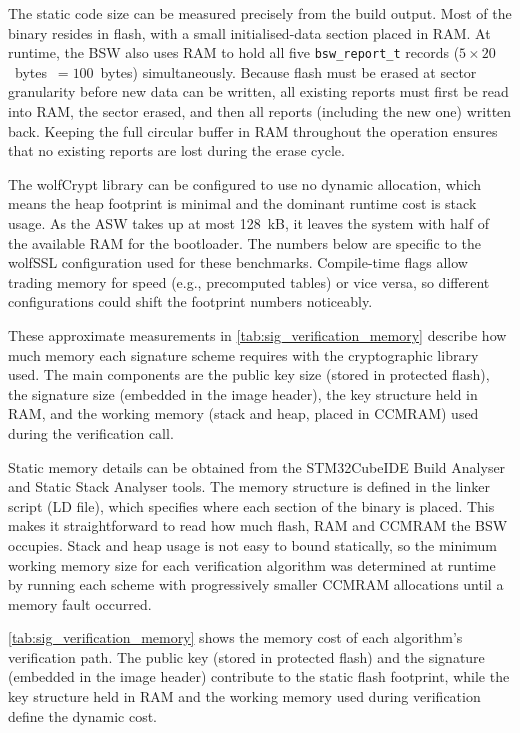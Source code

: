 The static code size can be measured precisely from the build output. Most of the binary resides in flash, with a small initialised-data section placed in RAM. At runtime, the BSW also uses RAM to hold all five \texttt{bsw\_report\_t} records ($5 \times 20$~bytes~$= 100$~bytes) simultaneously. Because flash must be erased at sector granularity before new data can be written, all existing reports must first be read into RAM, the sector erased, and then all reports (including the new one) written back. Keeping the full circular buffer in RAM throughout the operation ensures that no existing reports are lost during the erase cycle.

The wolfCrypt library can be configured to use no dynamic allocation, which means the heap footprint is minimal and the dominant runtime cost is stack usage. As the ASW takes up at most 128~kB, it leaves the system with half of the available RAM for the bootloader. The numbers below are specific to the wolfSSL configuration used for these benchmarks. Compile-time flags allow trading memory for speed (e.g., precomputed tables) or vice versa, so different configurations could shift the footprint numbers noticeably. 

These approximate measurements in \autoref{tab:sig_verification_memory} describe how much memory each signature scheme requires with the cryptographic library used. The main components are the public key size (stored in protected flash), the signature size (embedded in the image header), the key structure held in RAM, and the working memory (stack and heap, placed in CCMRAM) used during the verification call.

Static memory details can be obtained from the STM32CubeIDE Build Analyser and Static Stack Analyser tools. The memory structure is defined in the linker script (LD file), which specifies where each section of the binary is placed. This makes it straightforward to read how much flash, RAM and CCMRAM the BSW occupies. Stack and heap usage is not easy to bound statically, so the minimum working memory size for each verification algorithm was determined at runtime by running each scheme with progressively smaller CCMRAM allocations until a memory fault occurred.

\autoref{tab:sig_verification_memory} shows the memory cost of each algorithm's verification path. The public key (stored in protected flash) and the signature (embedded in the image header) contribute to the static flash footprint, while the key structure held in RAM and the working memory used during verification define the dynamic cost.

